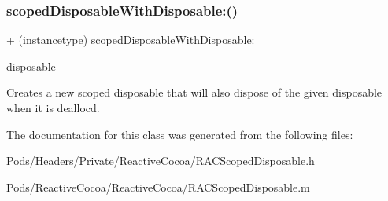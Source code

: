\subsubsection{\texorpdfstring{scoped\+Disposable\+With\+Disposable\+:()}{scopedDisposableWithDisposable:()}\hspace{0.1cm}{\footnotesize\ttfamily [3/3]}}
{\footnotesize\ttfamily + (instancetype) scoped\+Disposable\+With\+Disposable\+: \begin{DoxyParamCaption}\item[{(\mbox{\hyperlink{interface_r_a_c_disposable}{R\+A\+C\+Disposable}} $\ast$)}]{disposable }\end{DoxyParamCaption}}

Creates a new scoped disposable that will also dispose of the given disposable when it is dealloc\textquotesingle{}d. 

The documentation for this class was generated from the following files\+:\begin{DoxyCompactItemize}
\item 
Pods/\+Headers/\+Private/\+Reactive\+Cocoa/R\+A\+C\+Scoped\+Disposable.\+h\item 
Pods/\+Reactive\+Cocoa/\+Reactive\+Cocoa/R\+A\+C\+Scoped\+Disposable.\+m\end{DoxyCompactItemize}
